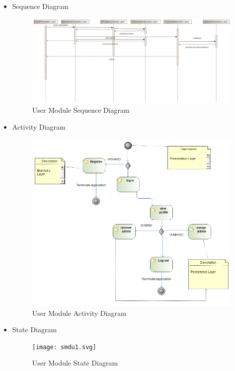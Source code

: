 \documentclass{article}
\begin{document}
\begin{itemize}
				\item Sequence Diagram				
 				\begin{center}
 					\begin{figure}[!h]
 						\includegraphics[scale=0.4]{isdu.png}
 						\caption{User Module Sequence Diagram}
 					\end{figure}
 				\end{center}
 				
 				\item Activity Diagram
 				\begin{center}
 					\begin{figure}[!h]
 						\includegraphics[scale=0.4]{uad.png}
 						\caption{User Module Activity Diagram}
 					\end{figure}
 				\end{center}
 				\pagebreak
 				
				\item State Diagram
				\begin{center}
					\begin{figure}[!h]
						\texttt{[image: smdu1.svg]}
						\caption{User Module State Diagram}
					\end{figure}
				\end{center}
			
 		\end{itemize}
\end{document}
